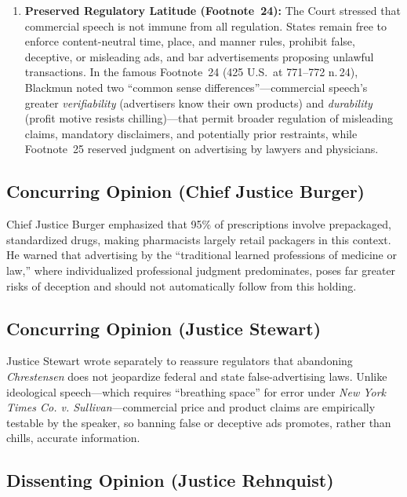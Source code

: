 \documentclass[12pt]{article}
\begin{document}
\begin{enumerate}
  \item \textbf{Preserved Regulatory Latitude (Footnote~24):} The Court stressed that commercial speech is not immune from all regulation. States remain free to enforce content-neutral time, place, and manner rules, prohibit false, deceptive, or misleading ads, and bar advertisements proposing unlawful transactions. In the famous Footnote~24 (425 U.S.\ at 771--772 n.\,24), Blackmun noted two ``common sense differences''---commercial speech's greater \textit{verifiability} (advertisers know their own products) and \textit{durability} (profit motive resists chilling)---that permit broader regulation of misleading claims, mandatory disclaimers, and potentially prior restraints, while Footnote~25 reserved judgment on advertising by lawyers and physicians.
\end{enumerate}

\subsection{Concurring Opinion (Chief Justice Burger)}

Chief Justice Burger emphasized that 95\% of prescriptions involve prepackaged, standardized drugs, making pharmacists largely retail packagers in this context. He warned that advertising by the ``traditional learned professions of medicine or law,'' where individualized professional judgment predominates, poses far greater risks of deception and should not automatically follow from this holding.

\subsection{Concurring Opinion (Justice Stewart)}

Justice Stewart wrote separately to reassure regulators that abandoning \textit{Chrestensen} does not jeopardize federal and state false-advertising laws. Unlike ideological speech---which requires ``breathing space'' for error under \textit{New York Times Co. v. Sullivan}---commercial price and product claims are empirically testable by the speaker, so banning false or deceptive ads promotes, rather than chills, accurate information.

\subsection{Dissenting Opinion (Justice Rehnquist)}
\end{document}
